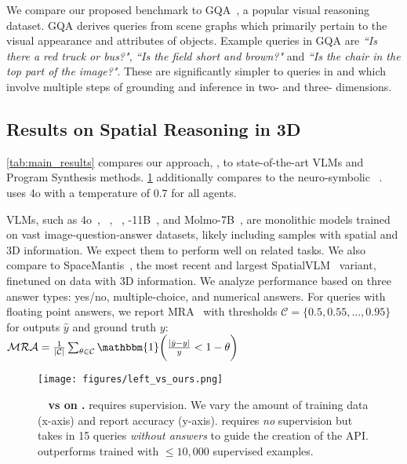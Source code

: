 We compare our proposed benchmark to GQA~\cite{gqa}, a popular visual reasoning dataset. GQA derives queries from scene graphs which primarily pertain to the visual appearance and attributes of objects. Example queries in GQA are \emph{``Is there a red truck or bus?"}, \emph{``Is the field short and brown?"} and \emph{``Is the chair in the top part of the image?"}. These are significantly simpler to queries in \clevr and \ourbench which involve multiple steps of grounding and inference in two- and three- dimensions.




\subsection{Results on Spatial Reasoning in 3D}

\cref{tab:main_results} compares our approach, \method, to state-of-the-art VLMs and Program Synthesis methods. \cref{fig:left_vs_ours} additionally compares to the neuro-symbolic \leftm~\cite{whatsleft}.
\method uses \gpt4o with a temperature of $0.7$ for all agents.

 VLMs, such as \gpt4o~\cite{gpt4}, \claude~\cite{claude}, \gemini~\cite{gemini}, \llama-11B~\cite{llama3}, and Molmo-7B~\cite{molmo}, are monolithic models trained on vast image-question-answer datasets, likely including samples with spatial and 3D information. We expect them to perform well on related tasks. We also compare to SpaceMantis~\cite{spatial, mantis}, the most recent and largest SpatialVLM~\cite{spatial} variant, finetuned on data with 3D information. We analyze performance based on three answer types: yes/no, multiple-choice, and numerical answers. For queries with floating point answers, we report MRA~\cite{thinkinginspace} with thresholds $\mathcal{C} = \{0.5, 0.55,...,0.95\}$ for outputs $\hat{y}$ and ground truth $y$: $\mathcal{MRA} = \frac{1}{|\mathcal{C}|} \sum_{\theta \in \mathcal{C}} \mathbbm{1} \bigg(\frac{|\hat{y} - y|}{y} < 1 - \theta \bigg)$



\begin{figure}[t!]
    \vspace{-5mm}
    \centering
    \texttt{[image: figures/left\_vs\_ours.png]}
    \vspace{-8mm}
    \caption{\textbf{\leftm~\cite{whatsleft} vs \method on \clevr.} \leftm requires supervision. We vary the amount of training data (x-axis) and report accuracy (y-axis). \method requires \emph{no} supervision but takes in 15 queries \emph{without answers} to guide the creation of the API. \method outperforms \leftm trained with $\leq 10,000$ supervised examples.}
    \label{fig:left_vs_ours}
    \vspace{-6mm}
\end{figure}



